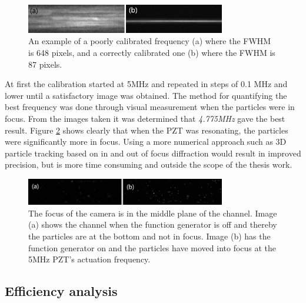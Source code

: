 \documentclass[twoside,twocolumn,9pt,a4paper]{IEEEtran}
\begin{document}
\begin{figure}[!htb]
\begin{center}
\includegraphics[width=8.7cm]{Images/2MHz_actuation.png} %
\caption{An example of a poorly calibrated frequency (a) where the FWHM is 648 pixels, and a correctly calibrated one (b) where the FWHM is 87 pixels.}
\label{2MHzComparison}
\end{center}
\end{figure} %

At first the calibration started at 5MHz and repeated in steps of 0.1 MHz and lower until a satisfactory image was obtained. The method for quantifying the best frequency was done through visual measurement when the particles were in focus. From the images taken it was determined that \textit{4.775MHz} gave the best result. Figure \ref{5MHzComparison} shows clearly that when the PZT was resonating, the particles were significantly more in focus. Using a more numerical approach such as 3D particle tracking based on in and out of focus diffraction \cite{Tasadduq} would result in improved precision, but is more time consuming and outside the scope of the thesis work.


\begin{figure}[H]
\begin{center}
\includegraphics[width=8.7cm]{Images/5mhz_actuation.png} %
\caption{The focus of the camera is in the middle plane of the channel. Image (a) shows the channel when the function generator is off and thereby the particles are at the bottom and not in focus. Image (b) has the function generator on and the particles have moved into focus at the 5MHz PZT's actuation frequency.}
\label{5MHzComparison}
\end{center}
\end{figure} %

\subsection{Efficiency analysis}
\label{efficiencyanalysis}
\end{document}
